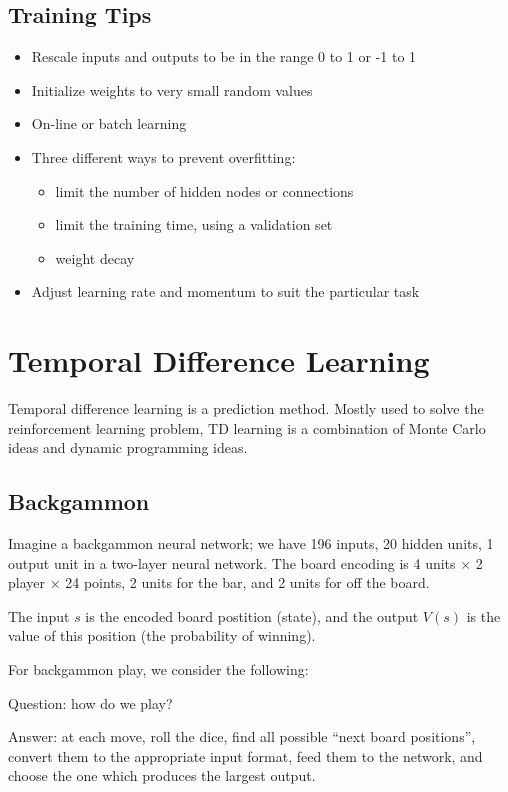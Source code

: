 \section{Training Tips}
\begin{itemize}
    \item Rescale inputs and outputs to be in the range 0 to 1 or -1 to 1
    \item Initialize weights to very small random values
    \item On-line or batch learning
    \item Three different ways to prevent overfitting:
        \begin{itemize}
            \item limit the number of hidden nodes or connections
            \item limit the training time, using a validation set
            \item weight decay
        \end{itemize}

    \item Adjust learning rate and momentum to suit the particular task
\end{itemize}

\chapter{Temporal Difference Learning}
Temporal difference learning is a prediction method. Mostly used to solve the
reinforcement learning problem, TD learning is a combination of Monte Carlo
ideas and dynamic programming ideas.

\section{Backgammon}
Imagine a backgammon neural network; we have 196 inputs, 20 hidden units, 1
output unit in a two-layer neural network. The board encoding is 4 units
$\times$ 2 player $\times$ 24 points, 2 units for the bar, and 2 units for off
the board.

The input $s$ is the encoded board postition (state), and the output $V(s)$ is
the value of this position (the probability of winning).

For backgammon play, we consider the following:

Question: how do we play?

Answer: at each move, roll the dice, find all possible ``next board
positions'', convert them to the appropriate input format, feed them to the
network, and choose the one which produces the largest output.


